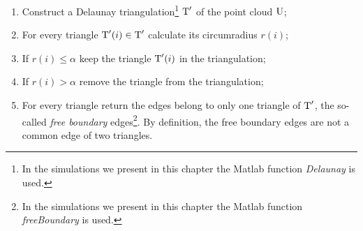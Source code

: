 \begin{enumerate}
\item Construct a Delaunay triangulation\footnote{In the simulations we present in this chapter the Matlab function \textit{Delaunay} is used.} $\mbox{$\textup{T}$}^\prime$ of the point cloud $\mbox{$\textup{U}$}$;
\item For every triangle $\mbox{$\textup{T}$}^\prime(i)\in \mbox{$\textup{T}$}^\prime$ calculate its circumradius $r(i)$;
\item If $r(i)\leq\alpha$ keep the triangle $\mbox{$\textup{T}$}^\prime(i)$ in the triangulation;
\item If $r(i)>\alpha$ remove the triangle from the triangulation;
\item For every triangle return the edges belong to only one triangle of $\mbox{$\textup{T}$}^{\prime}$, the so-called \textit{free boundary} edges\footnote{In the simulations we present in this chapter the Matlab function \textit{freeBoundary} is used.}. By definition, the free boundary edges are not a common edge of two triangles.
\end{enumerate}
